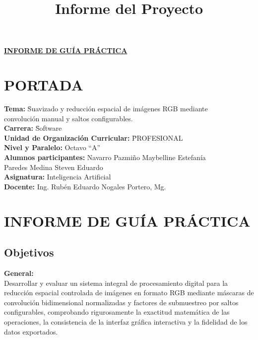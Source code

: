 \documentclass[11pt]{article}
\title{Informe del Proyecto}
\begin{document}
\titleformat{\section}{\normalfont\Large\bfseries}{\thesection}{1em}{}
\renewcommand{\thesection}{\Roman{section}}
\begin{center}
    \textbf{\underline{\normalsize INFORME DE GUÍA PRÁCTICA}}
\end{center}

\section{PORTADA}

\begin{tabbing}
\textbf{Tema:}\hspace{1cm} \= Suavizado y reducción espacial de imágenes RGB mediante \\
\> convolución manual y saltos configurables. \\
\textbf{Carrera:}\hspace{1cm} \= Software \\
\textbf{Unidad de Organización Curricular:} \hspace{1cm} \= PROFESIONAL\\
\textbf{Nivel y Paralelo:} \> Octavo ``A''\\
\textbf{Alumnos participantes:}  \> Navarro Pazmiño Maybelline Estefanía \\
\> Paredes Medina Steven Eduardo \\
\textbf{Asignatura:} \> Inteligencia Artificial \\
\textbf{Docente:} \> Ing. Rubén Eduardo Nogales Portero, Mg.
\end{tabbing}

\section{INFORME DE GUÍA PRÁCTICA}
\titleformat{\section}{\normalfont\Large\bfseries}{\thesection}{1em}{}
\renewcommand{\thesection}{\arabic{section}}

\subsection{Objetivos}
\textbf{General:}\\
Desarrollar y evaluar un sistema integral de procesamiento digital para la reducción espacial controlada de imágenes en formato RGB mediante máscaras de convolución bidimensional normalizadas y factores de submuestreo por saltos configurables, comprobando rigurosamente la exactitud matemática de las operaciones, la consistencia de la interfaz gráfica interactiva y la fidelidad de los datos exportados.
\end{document}
